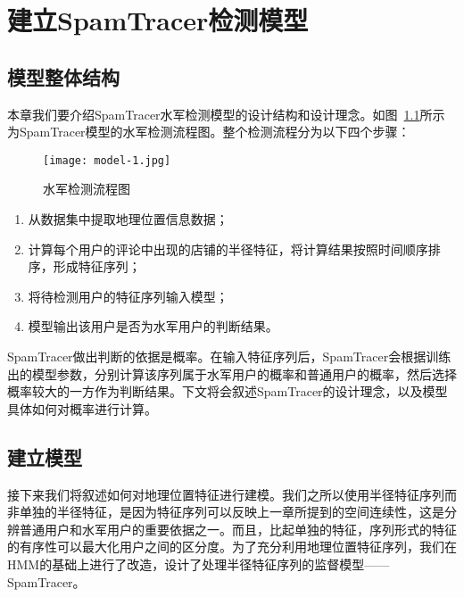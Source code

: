 
\chapter{建立SpamTracer检测模型}
\label{chap:model}


\section{模型整体结构}

本章我们要介绍SpamTracer水军检测模型的设计结构和设计理念。如图~\ref{fig:structure}所示为SpamTracer模型的水军检测流程图。整个检测流程分为以下四个步骤：

\begin{figure}[htbp]
	\centering
	\begin{minipage}[htbp]{\textwidth}
		\centering
		\texttt{[image: model-1.jpg]}
		\caption[水军检测流程图]
		{水军检测流程图\label{fig:structure}}		
	\end{minipage}     
\end{figure}

\begin{enumerate}
	\item[(1)] 从数据集中提取地理位置信息数据；
	\item[(2)] 计算每个用户的评论中出现的店铺的半径特征，将计算结果按照时间顺序排序，形成特征序列；
	\item[(3)] 将待检测用户的特征序列输入模型；
	\item[(4)] 模型输出该用户是否为水军用户的判断结果。
\end{enumerate}

SpamTracer做出判断的依据是概率。在输入特征序列后，SpamTracer会根据训练出的模型参数，分别计算该序列属于水军用户的概率和普通用户的概率，然后选择概率较大的一方作为判断结果。下文将会叙述SpamTracer的设计理念，以及模型具体如何对概率进行计算。



\section{建立模型}

接下来我们将叙述如何对地理位置特征进行建模。我们之所以使用半径特征序列而非单独的半径特征，是因为特征序列可以反映上一章所提到的空间连续性，这是分辨普通用户和水军用户的重要依据之一。而且，比起单独的特征，序列形式的特征的有序性可以最大化用户之间的区分度。为了充分利用地理位置特征序列，我们在HMM的基础上进行了改造，设计了处理半径特征序列的监督模型——SpamTracer。

